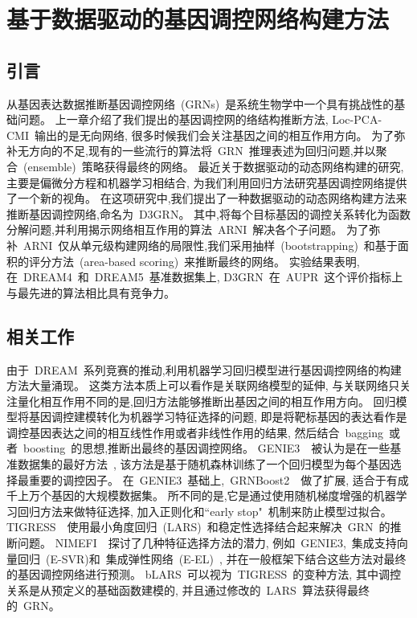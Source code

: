 \section{基于数据驱动的基因调控网络构建方法}
\label{sec:d3grn}

\subsection{引言}

从基因表达数据推断基因调控网络~(GRNs)~是系统生物学中一个具有挑战性的基础问题。
上一章介绍了我们提出的基因调控网的络结构推断方法,
Loc-PCA-CMI~输出的是无向网络, 很多时候我们会关注基因之间的相互作用方向。
为了弥补无方向的不足,现有的一些流行的算法将~GRN~推理表述为回归问题,并以聚合~(ensemble)~策略获得最终的网络。
最近关于数据驱动的动态网络构建的研究, 主要是偏微分方程和机器学习相结合, 
为我们利用回归方法研究基因调控网络提供了一个新的视角。
在这项研究中,我们提出了一种数据驱动的动态网络构建方法来推断基因调控网络,命名为~D3GRN。
其中,将每个目标基因的调控关系转化为函数分解问题,并利用揭示网络相互作用的算法~ARNI~解决各个子问题。
为了弥补~ARNI~仅从单元级构建网络的局限性,我们采用抽样~(bootstrapping)~和基于面积的评分方法~(area-based scoring)~来推断最终的网络。
实验结果表明, 在~DREAM4~和~DREAM5~基准数据集上, D3GRN~在~AUPR~这个评价指标上与最先进的算法相比具有竞争力。

\subsection{相关工作}

由于~DREAM~系列竞赛的推动,利用机器学习回归模型进行基因调控网络的构建方法大量涌现。
这类方法本质上可以看作是关联网络模型的延伸,
与关联网络只关注量化相互作用不同的是,回归方法能够推断出基因之间的相互作用方向。
回归模型将基因调控建模转化为机器学习特征选择的问题,
即是将靶标基因的表达看作是调控基因表达之间的相互线性作用或者非线性作用的结果,
然后结合~bagging~或者~boosting~的思想,推断出最终的基因调控网络。
GENIE3~\cite{huynh2010inferring}~被认为是在一些基准数据集的最好方法~\cite{marbach2010revealing},
该方法是基于随机森林训练了一个回归模型为每个基因选择最重要的调控因子。
在~GENIE3~基础上,~GRNBoost2~\cite{moerman2019grnboost2}~做了扩展, 适合于有成千上万个基因的大规模数据集。
所不同的是,它是通过使用随机梯度增强的机器学习回归方法来做特征选择, 
加入正则化和``early stop"~机制来防止模型过拟合。 
TIGRESS~\cite{Haury2012}~使用最小角度回归~(LARS)~和稳定性选择结合起来解决~GRN~的推断问题。
NIMEFI~\cite{ruyssinck2014nimefi}~探讨了几种特征选择方法的潜力,
例如~GENIE3,~集成支持向量回归~(E-SVR)和~集成弹性网络~(E-EL)~\cite{zou2005regularization},
并在一般框架下结合这些方法对最终的基因调控网络进行预测。
bLARS~\cite{singh2016blars}可以视为~TIGRESS~的变种方法,
其中调控关系是从预定义的基础函数建模的, 并且通过修改的~LARS~算法获得最终的~GRN。

